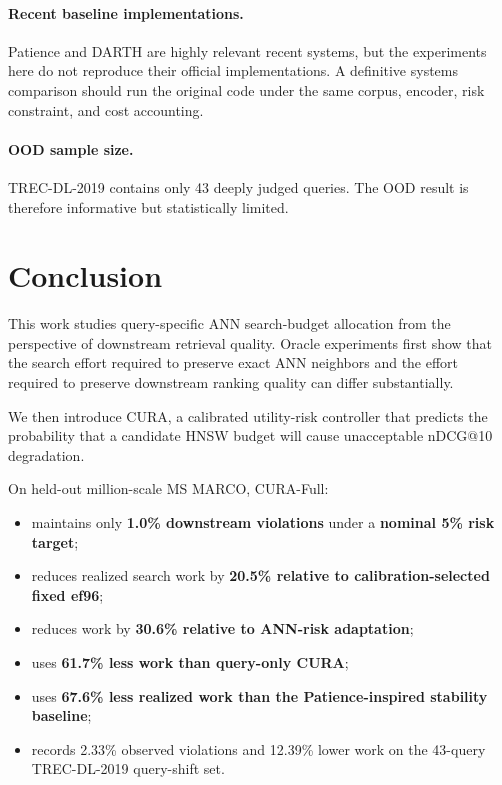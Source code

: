 \documentclass[10pt,twocolumn]{article}
\newcommand{\cura}{CURA}
\begin{document}
\paragraph{Recent baseline implementations.}
Patience and DARTH are highly relevant recent systems, but the experiments here do not reproduce their official implementations. A definitive systems comparison should run the original code under the same corpus, encoder, risk constraint, and cost accounting.

\paragraph{OOD sample size.}
TREC-DL-2019 contains only 43 deeply judged queries. The OOD result is therefore informative but statistically limited.

\section{Conclusion}
\label{sec:conclusion}
This work studies query-specific ANN search-budget allocation from the perspective of downstream retrieval quality. Oracle experiments first show that the search effort required to preserve exact ANN neighbors and the effort required to preserve downstream ranking quality can differ substantially.

We then introduce \cura{}, a calibrated utility-risk controller that predicts the probability that a candidate HNSW budget will cause unacceptable nDCG@10 degradation.

On held-out million-scale MS MARCO, \cura{}-Full:
\begin{itemize}
\item maintains only \textbf{1.0\% downstream violations} under a \textbf{nominal 5\% risk target};
\item reduces realized search work by \textbf{20.5\% relative to calibration-selected fixed ef96};
\item reduces work by \textbf{30.6\% relative to ANN-risk adaptation};
\item uses \textbf{61.7\% less work than query-only CURA};
\item uses \textbf{67.6\% less realized work than the Patience-inspired stability baseline};
\item records 2.33\% observed violations and 12.39\% lower work on the 43-query TREC-DL-2019 query-shift set.
\end{itemize}
\end{document}

